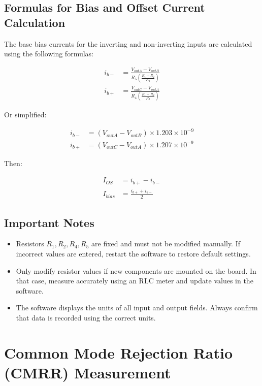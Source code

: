 \documentclass[a4paper,12pt]{article}
\begin{document}
\subsection*{Formulas for Bias and Offset Current Calculation}

The base bias currents for the inverting and non-inverting inputs are calculated using the following formulas:

\begin{align}
i_{b-} &= \frac{V_{outA} - V_{outB}}{R_5 \left( \frac{R_1 + R_2}{R_2} \right)} \\
i_{b+} &= \frac{V_{outC} - V_{outA}}{R_4 \left( \frac{R_1 + R_2}{R_2} \right)}
\end{align}

Or simplified:

\begin{align}
i_{b-} &= (V_{outA} - V_{outB}) \times 1.203 \times 10^{-9} \\
i_{b+} &= (V_{outC} - V_{outA}) \times 1.207 \times 10^{-9}
\end{align}

Then:

\begin{align}
I_{OS} &= i_{b+} - i_{b-} \\
I_{bias} &= \frac{i_{b+} + i_{b-}}{2}
\end{align}

\subsection*{Important Notes}

\begin{itemize}
  \item Resistors \( R_1, R_2, R_4, R_5 \) are fixed and must not be modified manually. If incorrect values are entered, restart the software to restore default settings.
  \item Only modify resistor values if new components are mounted on the board. In that case, measure accurately using an RLC meter and update values in the software.
  \item The software displays the units of all input and output fields. Always confirm that data is recorded using the correct units.
\end{itemize}

\newpage
\section{Common Mode Rejection Ratio (CMRR) Measurement}
\end{document}
